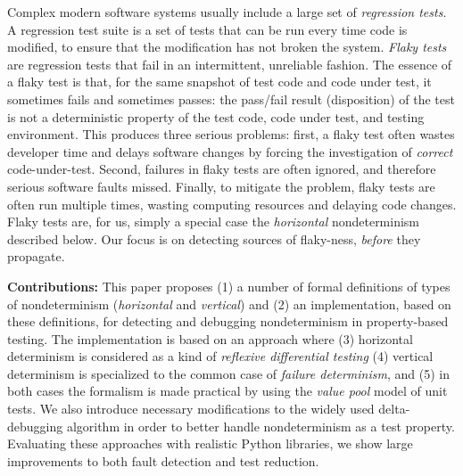 Complex
modern software systems usually include a large set of
\emph{regression tests}.  A regression test suite is a
set of tests that can be run every time code
is modified, to ensure that the modification has not broken the system.  \emph{Flaky tests} \cite{miccoflaky} are regression
tests that fail in an intermittent, unreliable fashion.  The essence of a flaky
test is that, for the same snapshot of test code and code under test, it sometimes fails and sometimes passes: the pass/fail result (disposition) of the
test is not a deterministic property of the test code, code under
test, and testing environment.  This produces three serious
problems: first, a flaky test often wastes developer time and delays
software changes by forcing the investigation of \emph{correct} code-under-test.  Second, failures in flaky tests are often ignored, and therefore serious software faults missed.  Finally, to mitigate the problem, flaky tests are often
run multiple times, wasting computing resources and
delaying code changes.  Flaky tests are, for us, simply a special case the 
\emph{horizontal} nondeterminism 
described below.  Our focus is on detecting sources of 
flaky-ness, \emph{before} they propagate.
\begin{comment}
  As an analogy, we note that  a canary in a coal mine is of
little use if canaries frequently become ill for reasons unrelated to
the presence of toxic gases.  Mining may stop for no good reason, or
miners may learn to ignore the canary, leading to tragedy; a third,
more ``practical'' option is that miners may carry so many redundant
canaries into the coal mine that canary-care itself becomes a serious burden.
\end{comment}





{\bf Contributions:} This paper proposes (1) a number of formal definitions of types of
nondeterminism (\emph{horizontal} and \emph{vertical}) and (2) an implementation, based on these definitions, for detecting and debugging
nondeterminism in property-based testing.  The implementation is based
on an approach where (3) horizontal determinism is considered as a
kind of \emph{reflexive differential testing} (4) vertical
determinism is specialized to the common case of \emph{failure
  determinism}, and (5)  in both cases the formalism is made practical
by using the \emph{value pool} model of unit tests.
We also introduce necessary modifications to the widely used delta-debugging algorithm in order to better handle
nondeterminism as a test property.  Evaluating these approaches with
realistic Python libraries, we show large improvements to both fault
detection and test reduction.

